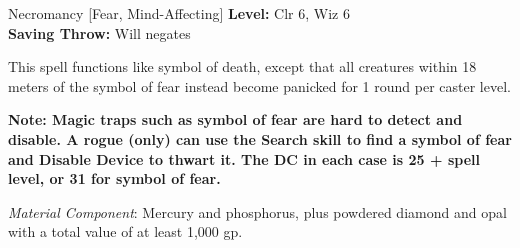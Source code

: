 {Necromancy [Fear, Mind-Affecting]}
{
	\textbf{Level:}
	Clr 6, Wiz 6\\
	\textbf{Saving Throw:}
	Will negates\\
}
{
	This spell functions like symbol of death, except that all creatures within 18 meters of the symbol of fear instead become panicked for 1 round per caster level.

	\textbf{Note: Magic traps such as symbol of fear are hard to detect and disable. A rogue (only) can use the Search skill to find a symbol of fear and Disable Device to thwart it. The DC in each case is 25 + spell level, or 31 for symbol of fear.}

	\textit{Material Component}:
	Mercury and phosphorus, plus powdered diamond and opal with a total value of at least 1,000 gp.

}
